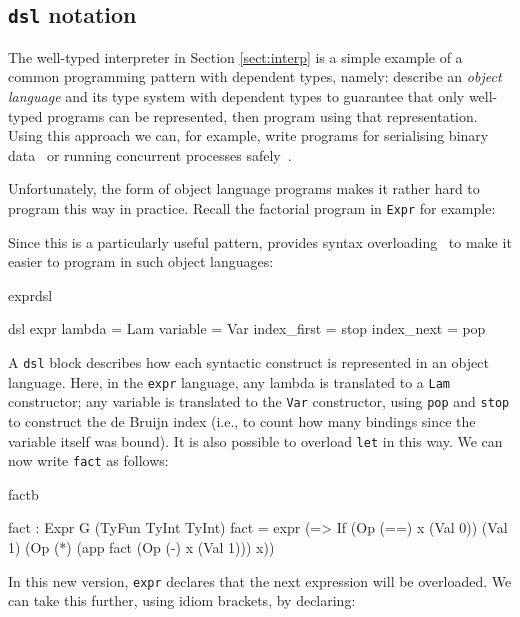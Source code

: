 \subsection{\texttt{dsl} notation}

The well-typed interpreter in Section \ref{sect:interp} is a simple example of
a common programming pattern with dependent types, namely: describe an
\emph{object language}
and its type system with dependent types to guarantee that only well-typed programs
can be represented, then program using that representation. Using this approach
we can, for example, write programs for serialising binary data~\cite{plpv11} or
running concurrent processes safely~\cite{cbconc-fi}.

Unfortunately, the form of object language programs makes it rather hard to program
this way in practice. Recall the factorial program in \texttt{Expr} for example:


\noindent
Since this is a particularly useful pattern, \Idris{} provides syntax
overloading~\cite{res-dsl-padl12} to make it easier to program in such
object languages:

\begin{SaveVerbatim}{exprdsl}

dsl expr
    lambda      = Lam
    variable    = Var
    index_first = stop
    index_next  = pop

\end{SaveVerbatim}

\noindent
A \texttt{dsl} block describes how each syntactic construct is represented in an
object language. Here, in the \texttt{expr} language, any \Idris{} lambda is
translated to a \texttt{Lam} constructor; any variable is translated to the
\texttt{Var} constructor, using \texttt{pop} and \texttt{stop} to construct the
de Bruijn index (i.e., to count how many bindings since the variable itself was bound).
It is also possible to overload \texttt{let} in this way. We can now write \texttt{fact}
as follows:

\begin{SaveVerbatim}{factb}

fact : Expr G (TyFun TyInt TyInt)
fact = expr (\x => If (Op (==) x (Val 0))
                      (Val 1) (Op (*) (app fact (Op (-) x (Val 1))) x))

\end{SaveVerbatim}

\noindent
In this new version, \texttt{expr} declares that the next expression will be overloaded.
We can take this further, using idiom brackets, by declaring:

